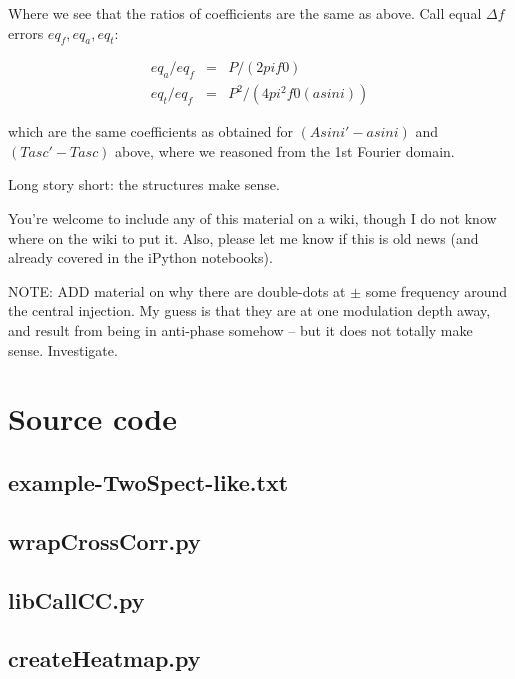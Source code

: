 \documentclass{article}
\begin{document}
Where we see that the ratios of coefficients are the same as above. Call
equal $\Delta f$ errors $eq_f, eq_a, eq_t$:

\begin{eqnarray}
eq_a / eq_f &=& P / (2 pi f0)\\
eq_t / eq_f &=& P^2/(4 pi^2 f0 (a sin i))
\end{eqnarray}

which are the same coefficients as obtained for $(Asini' - a sin i)$ and
$(Tasc' - Tasc)$ above, where we reasoned from the 1st Fourier domain.

Long story short: the structures make sense.

You're welcome to include any of this material on a wiki, though I do
not know where on the wiki to put it. Also, please let me know if this
is old news (and already covered in the iPython notebooks).


NOTE: ADD material on why there are double-dots at $\pm$ some frequency around the central injection. My guess is that they are at one modulation depth away, and result from being in anti-phase somehow -- but it does not totally make sense. Investigate.

\newpage

\appendix
\section{Source code}
\label{source_code_appendix}

\subsection{example-TwoSpect-like.txt}

\subsection{wrapCrossCorr.py}

\subsection{libCallCC.py}

\subsection{createHeatmap.py}

\end{document}
